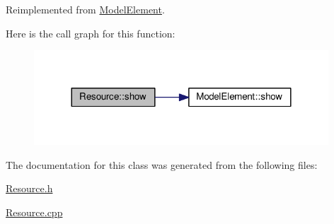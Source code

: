 Reimplemented from \hyperlink{class_model_element_af084d684e8effe5cd4c2265abc98896c}{Model\+Element}.



Here is the call graph for this function\+:\nopagebreak
\begin{figure}[H]
\begin{center}
\leavevmode
\includegraphics[width=312pt]{class_resource_a593cf83404dc90706943b4e60213fd01_cgraph}
\end{center}
\end{figure}




The documentation for this class was generated from the following files\+:\begin{DoxyCompactItemize}
\item 
\hyperlink{_resource_8h}{Resource.\+h}\item 
\hyperlink{_resource_8cpp}{Resource.\+cpp}\end{DoxyCompactItemize}
